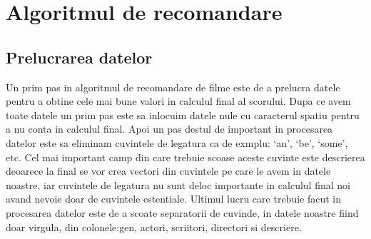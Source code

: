 \chapter{Algoritmul de recomandare }
\label{chap:ch1}

\section{Prelucrarea datelor}
\label{sec:ch3sec1}
\par Un prim pas in algoritmul de recomandare de filme este de a prelucra datele pentru a obtine cele mai bune valori in calculul final al scorului. Dupa ce avem toate datele un prim pas este sa inlocuim datele nule cu caracterul spatiu pentru a nu conta in calculul final. Apoi un pas destul de important in procesarea datelor este sa eliminam cuvintele de legatura ca de exmplu:  ‘an’, ‘be’, ‘some’, etc.  Cel mai important camp din care trebuie scoase aceste cuvinte este descrierea deoarece la final se vor crea vectori din cuvintele pe care le avem in datele noastre, iar cuvintele de legatura nu sunt deloc importante in calculul final noi avand nevoie doar de cuvintele estentiale. Ultimul lucru care trebuie facut in procesarea datelor este de a scoate separatorii de cuvinde, in datele noastre fiind doar virgula, din colonele:gen, actori, scriitori, directori si descriere. 


